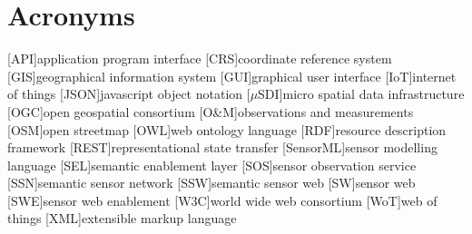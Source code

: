 
\chapter*{Acronyms}

\begin{acronym}[UML]
  [API]{application program interface}
  [CRS]{coordinate reference system} 
  [GIS]{geographical information system}
  [GUI]{graphical user interface}
  [IoT]{internet of things}
  [JSON]{javascript object notation}
  [$\mu$SDI]{micro spatial data infrastructure}
  [OGC]{open geospatial consortium}
  [O\&M]{observations and measurements}
  [OSM]{open streetmap}
  [OWL]{web ontology language}
  [RDF]{resource description framework}
  [REST]{representational state transfer}
  [SensorML]{sensor modelling language}
  [SEL]{semantic enablement layer}
  [SOS]{sensor observation service}
  [SSN]{semantic sensor network}
  [SSW]{semantic sensor web}
  [SW]{sensor web}
  [SWE]{sensor web enablement}
  [W3C]{world wide web consortium}
  [WoT]{web of things}
  [XML]{extensible markup language}
\end{acronym}